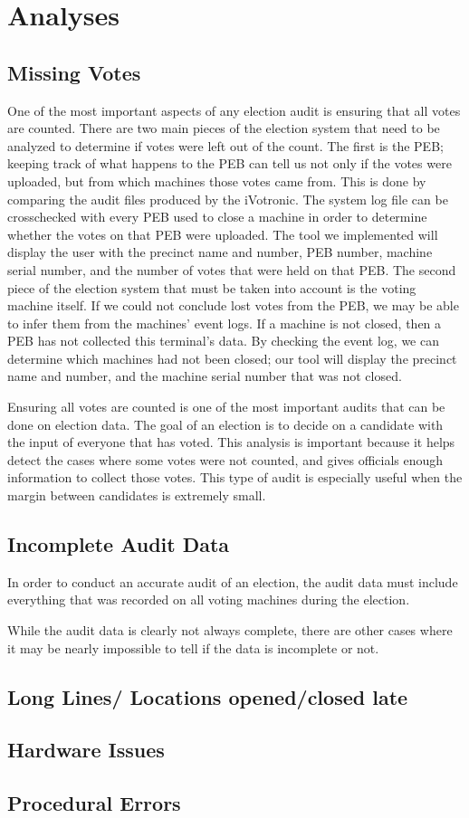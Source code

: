 \section{Analyses}

\subsection{Missing Votes}

One of the most important aspects of any election audit is ensuring that all votes are counted.  There are two main pieces of the election system that need to be analyzed to determine if votes were left out of the count.  The first is the PEB; keeping track of what happens to the PEB can tell us not only if the votes were uploaded, but from which machines those votes came from.  This is done by comparing the audit files produced by the iVotronic.  The system log file can be crosschecked with every PEB used to close a machine in order to determine whether the votes on that PEB were uploaded.  The tool we implemented will display the user with the precinct name and number, PEB number, machine serial number, and the number of votes that were held on that PEB.  The second piece of the election system that must be taken into account is the voting machine itself.  If we could not conclude lost votes from the PEB, we may be able to infer them from the machines' event logs.  If a machine is not closed, then a PEB has not collected this terminal's data.  By checking the event log, we can determine which machines had not been closed; our tool will display the precinct name and number, and the machine serial number that was not closed. 

Ensuring all votes are counted is one of the most important audits that can be done on election data.  The goal of an election is to decide on a candidate with the input of everyone that has voted.  This analysis is important because it helps detect the cases where some votes were not counted, and gives officials enough information to collect those votes.  This type of audit is especially useful when the margin between candidates is extremely small.  

\subsection{Incomplete Audit Data}

In order to conduct an accurate audit of an election, the audit data must include everything that was recorded on all voting machines during the election.  

While the audit data is clearly not always complete, there are other cases where it may be nearly impossible to tell if the data is incomplete or not.  

\subsection{Long Lines/ Locations opened/closed late}

\subsection{Hardware Issues}

\subsection{Procedural Errors}
